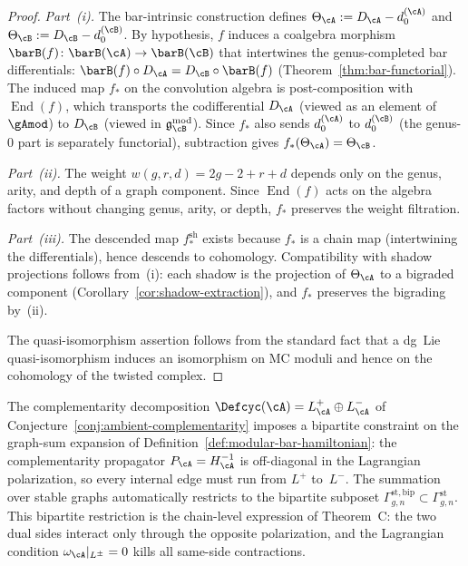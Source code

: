 \begin{proof}
\emph{Part~(i).}  The bar-intrinsic construction defines
$\Theta_\cA := D_\cA - d_0^{(\cA)}$ and
$\Theta_\cB := D_\cB - d_0^{(\cB)}$.
By hypothesis, $f$ induces a coalgebra morphism
$\barB(f)\colon \barB(\cA) \to \barB(\cB)$ that
intertwines the genus-completed bar differentials:
$\barB(f) \circ D_\cA = D_\cB \circ \barB(f)$
(Theorem~\ref{thm:bar-functorial}).
The induced map $f_*$ on the convolution algebra is
post-composition with $\operatorname{End}(f)$, which
transports the codifferential $D_\cA$
(viewed as an element of $\gAmod$)
to $D_\cB$ (viewed in $\mathfrak{g}_\cB^{\mathrm{mod}}$).
Since $f_*$ also sends $d_0^{(\cA)}$ to $d_0^{(\cB)}$
(the genus-$0$ part is separately functorial),
subtraction gives $f_*(\Theta_\cA) = \Theta_\cB$.

\emph{Part~(ii).} The weight $w(g,r,d) = 2g-2+r+d$ depends
only on the genus, arity, and depth of a graph component.
Since $\operatorname{End}(f)$ acts on the algebra factors
without changing genus, arity, or depth,
$f_*$ preserves the weight filtration.

\emph{Part~(iii).}  The descended map $f_*^{\mathrm{sh}}$
exists because $f_*$ is a chain map
(intertwining the differentials), hence descends to
cohomology.  Compatibility with shadow projections follows
from~(i): each shadow is the projection of $\Theta_\cA$
to a bigraded component
(Corollary~\ref{cor:shadow-extraction}), and $f_*$
preserves the bigrading by~(ii).

The quasi-isomorphism assertion follows from the standard
fact that a dg~Lie quasi-isomorphism induces an isomorphism
on MC moduli \cite[Corollary~11.4.8]{LV12} and hence on
the cohomology of the twisted complex.
\end{proof}

\begin{remark}
\label{rem:mc2-bipartite}
The complementarity decomposition
$\Defcyc(\cA) = L^+_\cA \oplus L^-_\cA$
of Conjecture~\ref{conj:ambient-complementarity} imposes a
bipartite constraint on the graph-sum expansion of
Definition~\ref{def:modular-bar-hamiltonian}: the
complementarity propagator $P_\cA = H_\cA^{-1}$ is
off-diagonal in the Lagrangian polarization, so every internal
edge must run from $L^+$ to~$L^-$.  The summation over stable
graphs automatically restricts to the bipartite subposet
$\Gamma^{\mathrm{st,bip}}_{g,n}
\subset \Gamma^{\mathrm{st}}_{g,n}$.
This bipartite restriction is the chain-level
expression of Theorem~C: the two dual sides
interact only through the opposite polarization, and
the Lagrangian condition $\omega_\cA|_{L^\pm} = 0$ kills all
same-side contractions.
\end{remark}

